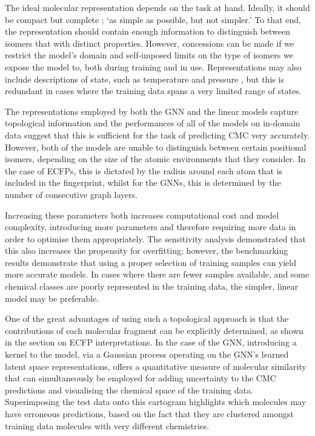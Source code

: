The ideal molecular
representation depends on the task at hand. Ideally, it should be compact but
complete
\cite{faberCrystalStructureRepresentations2015,himanenDScribeLibraryDescriptors2020};
`as simple as possible, but not simpler.' To that end, the representation should
contain enough information to distinguish between isomers that with distinct
properties. However, concessions can be made if we restrict the model's domain
and self-imposed limits on the type of isomers we expose the model to, both
during training and in use. Representations may also include descriptions of
state, such as temperature and pressure \cite{chenGraphNetworksUniversal2019},
but this is redundant in cases where the training data spans a very limited
range of states.

The representations employed by both the GNN and the linear models capture
topological information and the performances of all of the models on in-domain
data suggest that this is sufficient for the task of predicting CMC very
accurately. However, both of the models are unable to distinguish between
certain positional isomers, depending on the size of the atomic environments
that they consider. In the case of ECFPs, this is dictated by the radius around
each atom that is included in the fingerprint, whilst for the GNNs, this is
determined by the number of consecutive graph layers.

Increasing these parameters both increases computational cost and model
complexity, introducing more parameters and therefore requiring more data in
order to optimise them appropriately. The sensitivity analysis demonstrated that
this also increases the propensity for overfitting; however, the benchmarking
results demonstrate that using a proper selection of training samples can yield
more accurate models. In cases where there are fewer samples available, and some
chemical classes are poorly represented in the training data, the simpler,
linear model may be preferable.

One of the great advantages of using such a topological approach is that the
contributions of each molecular fragment can be explicitly determined, as shown
in the section on ECFP interpretations. In the case of the GNN, introducing a
kernel to the model, via a Gaussian process operating on the GNN's learned
latent space representations, offers a quantitative measure of molecular
similarity that can simultaneously be employed for adding uncertainty to the CMC
predictions and visualising the chemical space of the training data.
Superimposing the test data onto this cartogram highlights which molecules may
have erroneous predictions, based on the fact that they are clustered amongst
training data molecules with very different chemistries.

